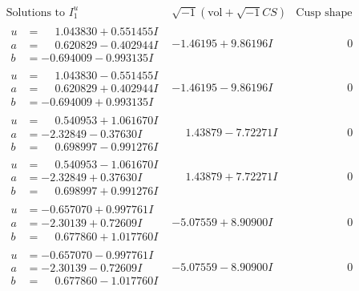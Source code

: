 \documentclass[1p]{elsarticle_modified}
\theoremstyle{definition}
\newcommand{\I}{\sqrt{-1}}
\begin{document}
$$\begin{array}{c|c|c}
 \end{array}$$\newpage$$\begin{array}{c|c|c}  
\text{Solutions to }I^u_{1}& \I (\text{vol} + \sqrt{-1}CS) & \text{Cusp shape}\\
 \hline 
\begin{aligned}
u &= \phantom{-}1.043830 + 0.551455 I \\
a &= \phantom{-}0.620829 - 0.402944 I \\
b &= -0.694009 - 0.993135 I\end{aligned}
 & -1.46195 + 9.86196 I & \phantom{-0.000000 } 0 \\ \hline\begin{aligned}
u &= \phantom{-}1.043830 - 0.551455 I \\
a &= \phantom{-}0.620829 + 0.402944 I \\
b &= -0.694009 + 0.993135 I\end{aligned}
 & -1.46195 - 9.86196 I & \phantom{-0.000000 } 0 \\ \hline\begin{aligned}
u &= \phantom{-}0.540953 + 1.061670 I \\
a &= -2.32849 - 0.37630 I \\
b &= \phantom{-}0.698997 - 0.991276 I\end{aligned}
 & \phantom{-}1.43879 - 7.72271 I & \phantom{-0.000000 } 0 \\ \hline\begin{aligned}
u &= \phantom{-}0.540953 - 1.061670 I \\
a &= -2.32849 + 0.37630 I \\
b &= \phantom{-}0.698997 + 0.991276 I\end{aligned}
 & \phantom{-}1.43879 + 7.72271 I & \phantom{-0.000000 } 0 \\ \hline\begin{aligned}
u &= -0.657070 + 0.997761 I \\
a &= -2.30139 + 0.72609 I \\
b &= \phantom{-}0.677860 + 1.017760 I\end{aligned}
 & -5.07559 + 8.90900 I & \phantom{-0.000000 } 0 \\ \hline\begin{aligned}
u &= -0.657070 - 0.997761 I \\
a &= -2.30139 - 0.72609 I \\
b &= \phantom{-}0.677860 - 1.017760 I\end{aligned}
 & -5.07559 - 8.90900 I & \phantom{-0.000000 } 0 \\ \hline\begin{aligned}

\end{aligned}
\end{array}$$
\end{document}
